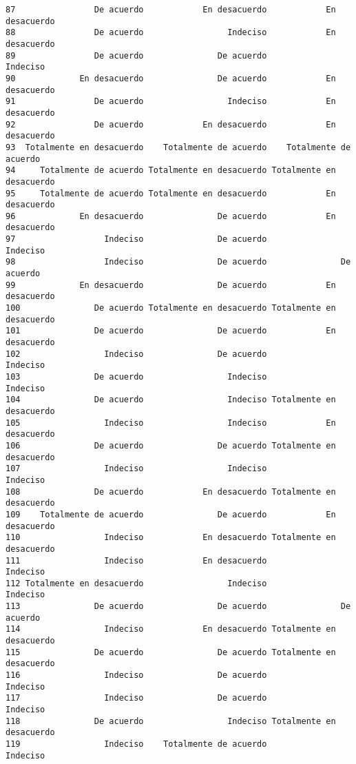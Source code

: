 \documentclass[
  letterpaper,
  DIV=11,
  numbers=noendperiod]{scrartcl}
\begin{document}
\begin{verbatim}
87                De acuerdo            En desacuerdo            En desacuerdo
88                De acuerdo                 Indeciso            En desacuerdo
89                De acuerdo               De acuerdo                 Indeciso
90             En desacuerdo               De acuerdo            En desacuerdo
91                De acuerdo                 Indeciso            En desacuerdo
92                De acuerdo            En desacuerdo            En desacuerdo
93  Totalmente en desacuerdo    Totalmente de acuerdo    Totalmente de acuerdo
94     Totalmente de acuerdo Totalmente en desacuerdo Totalmente en desacuerdo
95     Totalmente de acuerdo Totalmente en desacuerdo            En desacuerdo
96             En desacuerdo               De acuerdo            En desacuerdo
97                  Indeciso               De acuerdo                 Indeciso
98                  Indeciso               De acuerdo               De acuerdo
99             En desacuerdo               De acuerdo            En desacuerdo
100               De acuerdo Totalmente en desacuerdo Totalmente en desacuerdo
101               De acuerdo               De acuerdo            En desacuerdo
102                 Indeciso               De acuerdo                 Indeciso
103               De acuerdo                 Indeciso                 Indeciso
104               De acuerdo                 Indeciso Totalmente en desacuerdo
105                 Indeciso                 Indeciso            En desacuerdo
106               De acuerdo               De acuerdo Totalmente en desacuerdo
107                 Indeciso                 Indeciso                 Indeciso
108               De acuerdo            En desacuerdo Totalmente en desacuerdo
109    Totalmente de acuerdo               De acuerdo            En desacuerdo
110                 Indeciso            En desacuerdo Totalmente en desacuerdo
111                 Indeciso            En desacuerdo                 Indeciso
112 Totalmente en desacuerdo                 Indeciso                 Indeciso
113               De acuerdo               De acuerdo               De acuerdo
114                 Indeciso            En desacuerdo Totalmente en desacuerdo
115               De acuerdo               De acuerdo Totalmente en desacuerdo
116                 Indeciso               De acuerdo                 Indeciso
117                 Indeciso               De acuerdo                 Indeciso
118               De acuerdo                 Indeciso Totalmente en desacuerdo
119                 Indeciso    Totalmente de acuerdo                 Indeciso

\end{verbatim}
\end{document}
